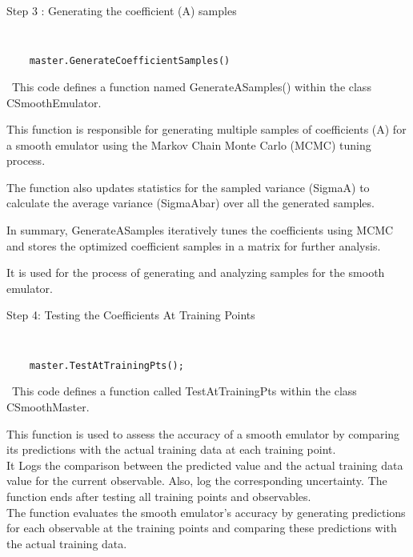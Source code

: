 \documentclass[12pt]{article}
\numberwithin{equation}{section}
\numberwithin{figure}{section}
\begin{document}
\begin{description}
\item[Step 3 : Generating the coefficient (A) samples]
\end{description}

{\tt 
\begin{verbatim}
    master.GenerateCoefficientSamples()
\end{verbatim}
}


\ This code defines a function named GenerateASamples() within the class CSmoothEmulator. 

This function is responsible for generating multiple samples of coefficients (A) for a smooth emulator using the Markov Chain Monte Carlo (MCMC) tuning process. 

The function also updates statistics for the sampled variance (SigmaA) to calculate the average variance (SigmaAbar) over all the generated samples. 

In summary, GenerateASamples iteratively tunes the coefficients using MCMC and stores the optimized coefficient samples in a matrix for further analysis. 

It is used for the process of generating and analyzing samples for the smooth emulator.

\begin{description}
\item[Step 4: Testing the Coefficients At Training Points]
\end{description}

{\tt 
\begin{verbatim}
    master.TestAtTrainingPts(); 
\end{verbatim}
}


\ This code defines a function called TestAtTrainingPts within the class CSmoothMaster.

This function is used to assess the accuracy of a smooth emulator by comparing its predictions with the actual training data at each training point. \\ 

It Logs the comparison between the predicted value and the actual training data value for the current observable. Also, log the corresponding uncertainty. The function ends after testing all training points and observables. \\ 

The function evaluates the smooth emulator's accuracy by generating predictions for each observable at the training points and comparing these predictions with the actual training data. \\ 
\end{document}
